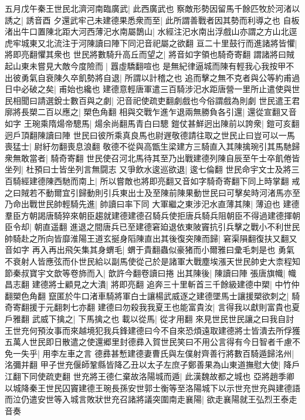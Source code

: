 五月戊午秦王世民北濟河南臨廣武|{
	此西廣武也}
察敵形勢因留馬千餘匹牧於河渚以誘之|{
	誘音酉}
夕還武牢己未建德果悉衆而至|{
	此所謂善戰者因其勢而利導之也}
自板渚出牛口置陳北距大河西薄汜水南屬鵲山|{
	水經注汜水南出浮戲山亦謂之方山北逕虎牢城東又北流注于河陳讀曰陣下同汜音祀屬之欲翻}
亘二十里鼓行而進諸將皆懼|{
	將即亮翻懼其衆也}
世民將數騎升高丘而望之|{
	將音如字領也騎奇寄翻}
謂諸將曰賊起山東未嘗見大敵今度險而|{
	囂虛驕翻喧也}
是無紀律逼城而陳有輕我心我按甲不出彼勇氣自衰陳久卒飢勢將自退|{
	所謂以計稽之也}
追而擊之無不克者與公等約甫過日中必破之矣|{
	甫始也纔也}
建德意輕唐軍遣三百騎涉汜水距唐營一里所止遣使與世民相聞曰請選銳士數百與之劇|{
	汜音祀使疏吏翻劇戲也今俗謂戲為則劇}
世民遣王君廓將長槊二百以應之|{
	槊色角翻}
相與交戰乍進乍退兩無勝負各引還|{
	還從宣翻又音如字}
王琬乘隋煬帝驄馬|{
	煬余尚翻馬青白曰驄}
鎧仗甚鮮迥出陳前以誇衆|{
	鎧可亥翻迥戶頂翻陳讀曰陣}
世民曰彼所乘真良馬也尉遟敬德請往取之世民止曰豈可以一馬喪猛士|{
	尉紆勿翻喪息浪翻}
敬德不從與高甑生梁建方三騎直入其陳擒琬引其馬馳歸衆無敢當者|{
	騎奇寄翻}
世民使召河北馬待其至乃出戰建德列陳自辰至午士卒飢倦皆坐列|{
	杜預曰士皆坐列言無闘志}
又爭飲水逡巡欲退|{
	逡七倫翻}
世民命宇文士及將三百騎經建德陳西馳而南上|{
	所以嘗敵也將即亮翻又音如字騎奇寄翻下同上時掌翻}
戒之曰賊若不動爾宜引歸動則引兵東出士及至陳前陳果動世民曰可擊矣時河渚馬亦至乃命出戰世民帥輕騎先進|{
	帥讀曰率下同}
大軍繼之東涉汜水直薄其陳|{
	薄迫也}
建德羣臣方朝謁唐騎猝來朝臣趨就建德建德召騎兵使拒唐兵騎兵阻朝臣不得過建德揮朝臣令却|{
	朝直遥翻}
進退之間唐兵已至建德窘廹退依東陂竇抗引兵擊之戰小不利世民帥騎赴之所向皆靡淮陽王道玄挻身䧟陳直出其後復突陳而歸|{
	窘渠隕翻復扶又翻又音如字}
再入再出飛矢集其身蝟毛|{
	蝟于貴翻蟲似豪猪而小爾雅曰彚毛刺是也}
勇氣不衰射人皆應弦而仆世民給以副馬使從己於是諸軍大戰塵埃漲天世民帥史大柰程知節秦叔寶宇文歆等卷斾而入|{
	歆許今翻卷讀曰捲}
出其陳後|{
	陳讀曰陣}
張唐旗幟|{
	幟昌志翻}
建德將士顧見之大潰|{
	將即亮翻}
追奔三十里斬首三千餘級建德中槊|{
	中竹仲翻槊色角翻}
竄匿於牛口渚車騎將軍白士讓楊武威逐之建德墜馬士讓援槊欲刺之|{
	騎奇寄翻援于元翻刺七亦翻}
建德曰勿殺我我夏王也能富貴汝|{
	言得我以獻則富貴也夏戶雅翻}
武威下擒之|{
	下馬擒之也}
載以從馬|{
	從才用翻}
來見世民世民讓之曰我自討王世充何預汝事而來越境犯我兵鋒建德曰今不自來恐煩遠取建德將士皆潰去所俘獲五萬人世民即日散遣之使還郷里封德彞入賀世民笑曰不用公言得有今日智者千慮不免一失乎|{
	用李左車之言}
德彞甚慙建德妻曹氏與左僕射齊善行將數百騎遁歸洺州|{
	洺彌并翻}
甲子世充偃師鞏縣皆降乙丑以太子左庶子鄭善果為山東道撫慰大使|{
	降戶江翻下同使疏吏翻}
世充將王德仁棄故洛陽城而遁|{
	此漢魏故都之城也}
亞將趙季卿以城降秦王世民囚竇建德王琬長孫安世郭士衡等至洛陽城下以示世充世充與建德語而泣仍遣安世等入城言敗狀世充召諸將議突圍南走襄陽|{
	欲走襄陽就王弘烈王泰走音奏}
